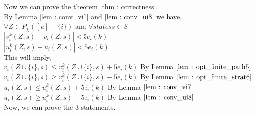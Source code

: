 										Now we can prove the theorem \ref{thm : correctness}.\\
										By Lemma \ref{lem : conv_vi7} and \ref{lem : conv_ui8} we have, \\
										$\forall Z \in P_\chi([n]-\{i\})$ and $\forall states s \in S$\\
										$|v_i^{k}(Z,s)-v_i(Z,s)| < 5e_i(k)$\\
										$|u_i^{k}(Z,s) - u_i(Z,s)| < 5e_i(k)$\\
										This will imply,\\
										$v_i(Z \cup \{i\},s) \le v_i^{k}(Z \cup \{i\},s) + 5e_i(k)$  By Lemma $ \ref{lem : opt_finite_path5}$\\
										$v_i(Z \cup \{i\},s) \ge v_i^{k}(Z \cup \{i\},s) - 5e_i(k)$  By Lemma $ \ref{lem : opt_finite_strat6}$\\
										$u_i(Z ,s) \le u_i^{k}(Z ,s) + 5e_i(k)$  By Lemma $ \ref{lem : conv_vi7}$\\
										$u_i(Z ,s) \ge u_i^{k}(Z ,s) - 5e_i(k)$  By Lemma $ \ref{lem : conv_ui8}$\\
										\cite{MariPhD}
										Now, we can prove the $3$ statements.\\
